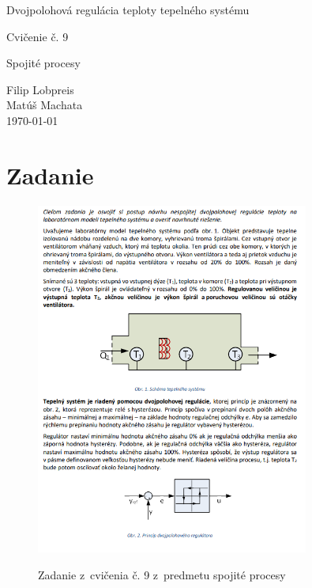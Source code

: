 \documentclass{article}
\begin{document}
\begin{titlepage}
	\null\vfill

	\begin{center}
		{\Huge Dvojpolohová regulácia teploty tepelného systému }
		\vskip 2cm

		{\Large Cvičenie č. 9}
		\vskip 0.5cm

		{\large Spojité procesy}
	\end{center}

	\vfill
	\vfill

	\begin{flushright}
		Filip Lobpreis \\
		Matúš Machata \\
		\small\today\\
	\end{flushright}
	\hfill
\end{titlepage}

\thispagestyle{empty}
\clearpage

\tableofcontents
\thispagestyle{empty}
\clearpage

\section{Zadanie}
\label{sec:zadanie}

\begin{figure}[!htbp]
	\begin{center}
		\label{fig:zadanie}
		\includegraphics[width=0.8\textwidth]{./include/zadanie.png}
	\end{center}
	\caption{Zadanie z~cvičenia č. 9 z~predmetu spojité procesy}
\end{figure}
\end{document}
